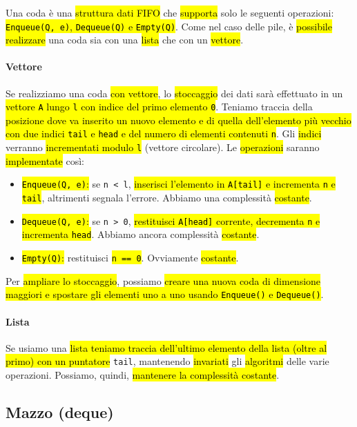 \documentclass[a4paper,11pt,oneside]{article}
\theoremstyle{plain}
\theoremstyle{definition}
\theoremstyle{remark}
\begin{document}
Una coda è una \hl{struttura dati FIFO} che \hl{supporta} solo le seguenti
operazioni: \hl{\texttt{Enqueue(Q, e)}, \texttt{Dequeue(Q)} e
\texttt{Empty(Q)}}. Come nel caso delle pile, è \hl{possibile realizzare} una
coda sia con una \hl{lista} che con un \hl{vettore}.

\paragraph{Vettore} Se realizziamo una coda \hl{con vettore}, lo \hl{stoccaggio}
dei dati sarà effettuato in un \hl{vettore \texttt{A} lungo \texttt{l} con
indice del primo elemento \texttt{0}}. Teniamo traccia della \hl{posizione dove
va inserito un nuovo elemento e di quella dell'elemento più vecchio con due
indici \texttt{tail} e \texttt{head} e del numero di elementi contenuti
\texttt{n}}. Gli \hl{indici} verranno \hl{incrementati modulo \texttt{l}}
(vettore circolare). Le \hl{operazioni} saranno \hl{implementate} così:

\begin{itemize}
  \item \hl{\texttt{Enqueue(Q, e)}:} se \texttt{n < l}, \hl{inserisci l'elemento
    in \texttt{A[tail]} e incrementa \texttt{n} e \texttt{tail}}, altrimenti
    segnala l'errore. Abbiamo una complessità \hl{costante}.
  \item \hl{\texttt{Dequeue(Q, e)}:} se \texttt{n > 0}, \hl{restituisci
    \texttt{A[head]} corrente, decrementa \texttt{n} e incrementa
    \texttt{head}}. Abbiamo ancora complessità \hl{costante}.
  \item \hl{\texttt{Empty(Q)}:} restituisci \hl{\texttt{n == 0}}. Ovviamente
    \hl{costante}.
\end{itemize}

\noindent Per \hl{ampliare lo stoccaggio}, possiamo \hl{creare una nuova coda di
dimensione maggiori e spostare gli elementi uno a uno usando \texttt{Enqueue()}
e \texttt{Dequeue()}}.

\paragraph{Lista} Se usiamo una \hl{lista teniamo traccia dell'ultimo elemento
della lista (oltre al primo) con un puntatore} \texttt{tail}, mantenendo
\hl{invariati} gli \hl{algoritmi} delle varie operazioni. Possiamo, quindi,
\hl{mantenere la complessità costante}.

\subsection{Mazzo (deque)}\label{sec:deque}
\end{document}
